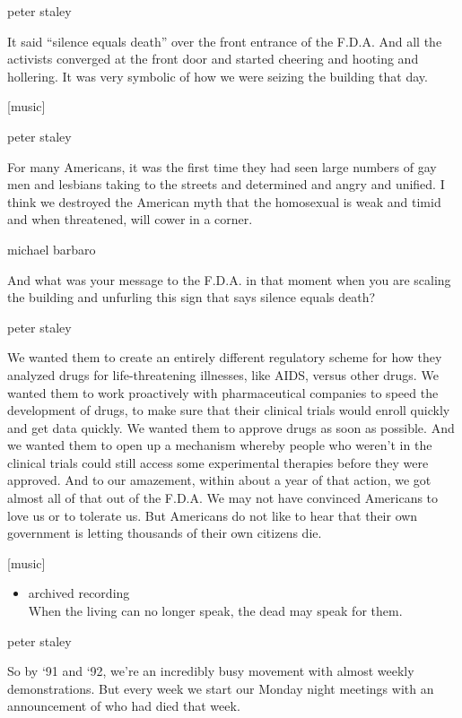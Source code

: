 peter staley

It said ``silence equals death'' over the front entrance of the F.D.A.
And all the activists converged at the front door and started cheering
and hooting and hollering. It was very symbolic of how we were seizing
the building that day.

{[}music{]}

peter staley

For many Americans, it was the first time they had seen large numbers of
gay men and lesbians taking to the streets and determined and angry and
unified. I think we destroyed the American myth that the homosexual is
weak and timid and when threatened, will cower in a corner.

michael barbaro

And what was your message to the F.D.A. in that moment when you are
scaling the building and unfurling this sign that says silence equals
death?

peter staley

We wanted them to create an entirely different regulatory scheme for how
they analyzed drugs for life-threatening illnesses, like AIDS, versus
other drugs. We wanted them to work proactively with pharmaceutical
companies to speed the development of drugs, to make sure that their
clinical trials would enroll quickly and get data quickly. We wanted
them to approve drugs as soon as possible. And we wanted them to open up
a mechanism whereby people who weren't in the clinical trials could
still access some experimental therapies before they were approved. And
to our amazement, within about a year of that action, we got almost all
of that out of the F.D.A. We may not have convinced Americans to love us
or to tolerate us. But Americans do not like to hear that their own
government is letting thousands of their own citizens die.

{[}music{]}

\begin{itemize}
\tightlist
\item
  archived recording\\
  When the living can no longer speak, the dead may speak for them.
\end{itemize}

peter staley

So by `91 and `92, we're an incredibly busy movement with almost weekly
demonstrations. But every week we start our Monday night meetings with
an announcement of who had died that week.


